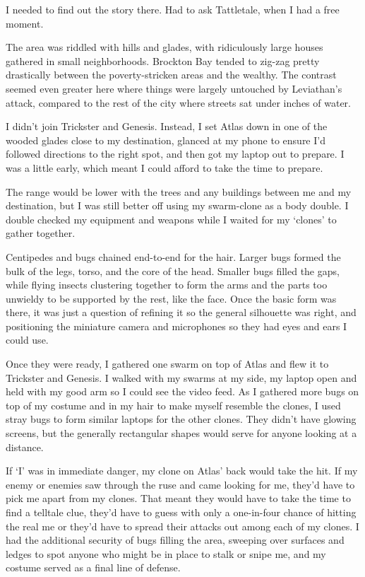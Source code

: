 I needed to find out the story there.  Had to ask Tattletale, when I had a free moment.



The area was riddled with hills and glades, with ridiculously large houses gathered in small neighborhoods.  Brockton Bay tended to zig-zag pretty drastically between the poverty-stricken areas and the wealthy.  The contrast seemed even greater here where things were largely untouched by Leviathan's attack, compared to the rest of the city where streets sat under inches of water.



I didn't join Trickster and Genesis.  Instead, I set Atlas down in one of the wooded glades close to my destination, glanced at my phone to ensure I'd followed directions to the right spot, and then got my laptop out to prepare.  I was a little early, which meant I could afford to take the time to prepare.



The range would be lower with the trees and any buildings between me and my destination, but I was still better off using my swarm-clone as a body double.  I double checked my equipment and weapons while I waited for my `clones' to gather together.



Centipedes and bugs chained end-to-end for the hair.  Larger bugs formed the bulk of the legs, torso, and the core of the head.  Smaller bugs filled the gaps, while flying insects clustering together to form the arms and the parts too unwieldy to be supported by the rest, like the face.  Once the basic form was there, it was just a question of refining it so the general silhouette was right, and positioning the miniature camera and microphones so they had eyes and ears I could use.



Once they were ready, I gathered one swarm on top of Atlas and flew it to Trickster and Genesis.  I walked with my swarms at my side, my laptop open and held with my good arm so I could see the video feed.  As I gathered more bugs on top of my costume and in my hair to make myself resemble the clones, I used stray bugs to form similar laptops for the other clones.  They didn't have glowing screens, but the generally rectangular shapes would serve for anyone looking at a distance.



If `I' was in immediate danger, my clone on Atlas' back would take the hit.  If my enemy or enemies saw through the ruse and came looking for me, they'd have to pick me apart from my clones.  That meant they would have to take the time to find a telltale clue, they'd have to guess with only a one-in-four chance of hitting the real me or they'd have to spread their attacks out among each of my clones.  I had the additional security of bugs filling the area, sweeping over surfaces and ledges to spot anyone who might be in place to stalk or snipe me, and my costume served as a final line of defense.



